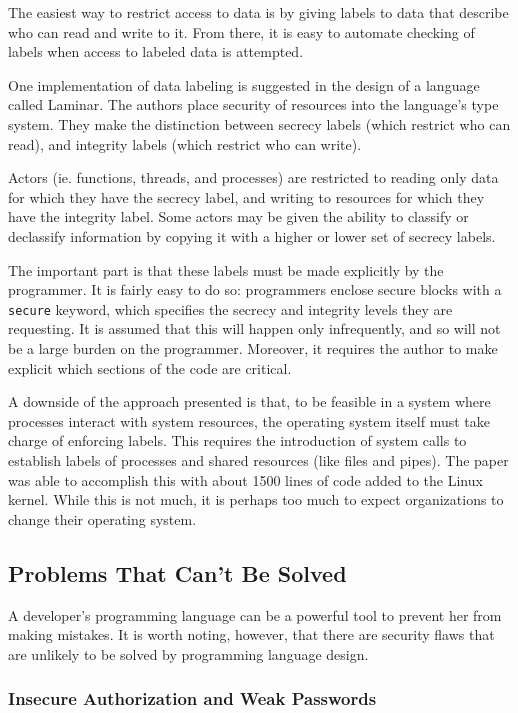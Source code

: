 \documentclass[twocolumn]{article}
\begin{document}
The easiest way to restrict access to data is by giving labels to data that describe who can read and write to it.  From there, it is easy to automate checking of labels when access to labeled data is attempted.

One implementation of data labeling is suggested in the design of a language called Laminar.  The authors place security of resources into the language's type system.  They make the distinction between secrecy labels (which restrict who can read), and integrity labels (which restrict who can write).\cite{roy2009}

Actors (ie. functions, threads, and processes) are restricted to reading only data for which they have the secrecy label, and writing to resources for which they have the integrity label.  Some actors may be given the ability to classify or declassify information by copying it with a higher or lower set of secrecy labels.

The important part is that these labels must be made explicitly by the programmer.  It is fairly easy to do so: programmers enclose secure blocks with a \verb;secure; keyword, which specifies the secrecy and integrity levels they are requesting.  It is assumed that this will happen only infrequently, and so will not be a large burden on the programmer.  Moreover, it requires the author to make explicit which sections of the code are critical.\cite{roy2009}

A downside of the approach presented is that, to be feasible in a system where processes interact with system resources, the operating system itself must take charge of enforcing labels.   This requires the introduction of system calls to establish labels of processes and shared resources (like files and pipes).  The paper was able to accomplish this with about 1500 lines of code added to the Linux kernel.\cite{roy2009}  While this is not much, it is perhaps too much to expect organizations to change their operating system.

\subsection{Problems That Can't Be Solved}

A developer's programming language can be a powerful tool to prevent her from making mistakes.  It is worth noting, however, that there are security flaws that are unlikely to be solved by programming language design.


\subsubsection{Insecure Authorization and Weak Passwords}
\end{document}

